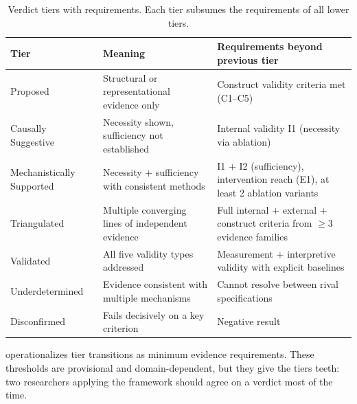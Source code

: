 \documentclass[10pt]{article}
\newcommand{\tighttable}{\setlength{\tabcolsep}{4pt}\renewcommand{\arraystretch}{1.05}}
\begin{document}
\begin{table}[H]
\centering
\tighttable
\caption{Verdict tiers with requirements. Each tier subsumes the requirements of all lower tiers.}
\label{tab:verdicts}
\small
\begin{tabular}{@{}lp{4.5cm}p{5.5cm}@{}}
\toprule
\textbf{Tier} & \textbf{Meaning} & \textbf{Requirements beyond previous tier} \\
\midrule
Proposed & Structural or representational evidence only & Construct validity criteria met (C1--C5) \\
\midrule
Causally Suggestive & Necessity shown, sufficiency not established & Internal validity I1 (necessity via ablation) \\
\midrule
Mechanistically Supported & Necessity + sufficiency with consistent methods & I1 + I2 (sufficiency), intervention reach (E1), at least 2 ablation variants \\
\midrule
Triangulated & Multiple converging lines of independent evidence & Full internal + external + construct criteria from $\geq 3$ evidence families \\
\midrule
Validated & All five validity types addressed & Measurement + interpretive validity with explicit baselines \\
\midrule
Underdetermined & Evidence consistent with multiple mechanisms & Cannot resolve between rival specifications \\
\midrule
Disconfirmed & Fails decisively on a key criterion & Negative result \\
\bottomrule
\end{tabular}
\end{table}

 operationalizes tier transitions as minimum evidence requirements. These thresholds are provisional and domain-dependent, but they give the tiers teeth: two researchers applying the framework should agree on a verdict most of the time.
\end{document}
